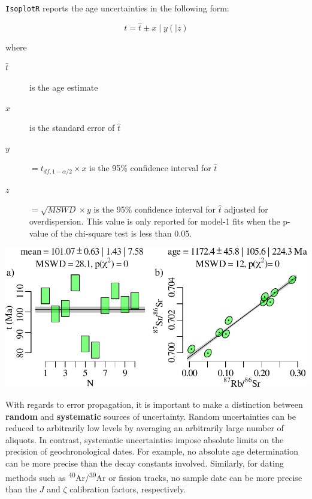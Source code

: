 \begin{refsection}
\texttt{IsoplotR} reports the age uncertainties in the following
form:

\[
t = \hat{t} \pm x \mid y (\mid z)
\]

\noindent where

\begin{description}
\item[$\hat{t}$] is the age estimate
\item[$x$] is the standard error of $\hat{t}$
\item[$y$] $= t_{df,1-\alpha/2} \times x$ is the 95\% confidence interval for
  $\hat{t}$
\item[$z$] $= \sqrt{MSWD} \times y$ is the 95\% confidence interval for
  $\hat{t}$ adjusted for overdispersion. This value is only reported
  for model-1 fits when the p-value of the chi-square test is less
  than 0.05.
\end{description}

\noindent\begin{minipage}[t][][b]{.6\textwidth}
  \includegraphics[width=\textwidth]{../figures/model-1.pdf}\\
\end{minipage}
\begin{minipage}[t][][t]{.4\textwidth}
  \label{fig:model-1}
\end{minipage}

With regards to error propagation, it is important to make a
distinction between \textbf{random} and \textbf{systematic} sources of
uncertainty. Random uncertainties can be reduced to arbitrarily low
levels by averaging an arbitrarily large number of aliquots. In
contrast, systematic uncertainties impose absolute limits on the
precision of geochronological dates.  For example, no absolute age
determination can be more precise than the decay constants
involved. Similarly, for dating methods such as
\textsuperscript{40}Ar/\textsuperscript{39}Ar or fission tracks, no
sample date can be more precise than the $J$ and $\zeta$ calibration
factors, respectively.\\


\end{refsection}
